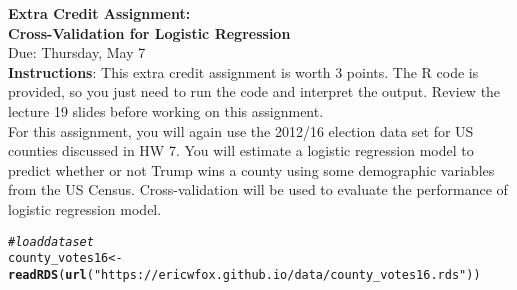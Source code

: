 \documentclass[11pt]{article}\usepackage[]{graphicx}\usepackage[]{color}
\makeatletter
\newcommand{\hlstr}[1]{\textcolor[rgb]{0.192,0.494,0.8}{#1}}%
\newcommand{\hlcom}[1]{\textcolor[rgb]{0.678,0.584,0.686}{\textit{#1}}}%
\newcommand{\hlstd}[1]{\textcolor[rgb]{0.345,0.345,0.345}{#1}}%
\newcommand{\hlkwb}[1]{\textcolor[rgb]{0.69,0.353,0.396}{#1}}%
\newcommand{\hlkwd}[1]{\textcolor[rgb]{0.737,0.353,0.396}{\textbf{#1}}}%
\newenvironment{kframe}{%
 \def\at@end@of@kframe{}%
 \ifinner\ifhmode%
  \def\at@end@of@kframe{\end{minipage}}%
  \begin{minipage}{\columnwidth}%
 \fi\fi%
 \def\FrameCommand##1{\hskip\@totalleftmargin \hskip-\fboxsep
 \colorbox{shadecolor}{##1}\hskip-\fboxsep
     \hskip-\linewidth \hskip-\@totalleftmargin \hskip\columnwidth}%
 \MakeFramed {\advance\hsize-\width
   \@totalleftmargin\z@ \linewidth\hsize
   \@setminipage}}%
 {\par\unskip\endMakeFramed%
 \at@end@of@kframe}
\newenvironment{knitrout}{}{} %
\makeatother
\begin{document}
\setlength\parindent{0pt}

\textbf{Extra Credit Assignment:}\\ 
\textbf{Cross-Validation for Logistic Regression}\\
Due: Thursday, May 7\\

\textbf{Instructions}: This extra credit assignment is worth 3 points.  The R code is provided, so you just need to run the code and interpret the output.  Review the lecture 19 slides before working on this assignment.\\

For this assignment, you will again use the 2012/16 election data set for US counties discussed in HW 7.  You will estimate a logistic regression model to predict whether or not Trump wins a county using some demographic variables from the US Census.  Cross-validation will be used to evaluate the performance of logistic regression model.

\begin{knitrout}
\color{fgcolor}\begin{kframe}
\begin{alltt}
\hlcom{# load data set}
\hlstd{county_votes16} \hlkwb{<-} \hlkwd{readRDS}\hlstd{(}\hlkwd{url}\hlstd{(}\hlstr{"https://ericwfox.github.io/data/county_votes16.rds"}\hlstd{))}
\end{alltt}
\end{kframe}
\end{knitrout}
\end{document}
